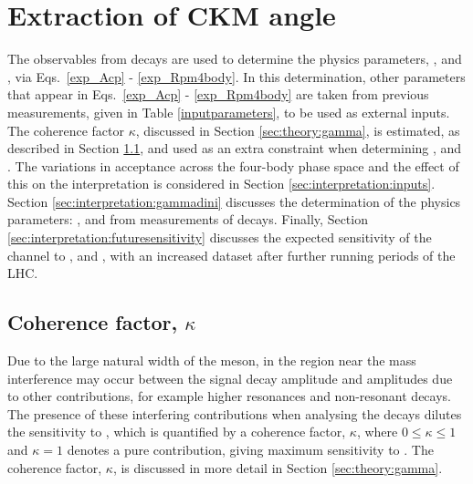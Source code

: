 \clearpage
%

\chapter{\label{ch:6-interpretation}Extraction of CKM angle \Pgamma} 

\minitoc

The \CP observables from \btodkst decays are used to determine the physics parameters, \rb, \deltab and \Pgamma, via Eqs.~\ref{exp_Acp} - \ref{exp_Rpm4body}. In this determination, other parameters that appear in Eqs.~\ref{exp_Acp} - \ref{exp_Rpm4body} are taken from previous measurements, given in Table \ref{inputparameters}, to be used as external inputs. The coherence factor $\kappa$, discussed in Section \ref{sec:theory:gamma}, is estimated, as described in Section \ref{sec:interpretation:coherence}, and used as an extra constraint when determining \rb, \deltab and \Pgamma. The variations in acceptance across the four-body phase space and the effect of this on the interpretation is considered in Section \ref{sec:interpretation:inputs}. Section \ref{sec:interpretation:gammadini} discusses the determination of the physics parameters: \rb, \deltab and \Pgamma from measurements of \btodkst decays. Finally, Section \ref{sec:interpretation:futuresensitivity} discusses the expected sensitivity of the \btodkst channel to \rb, \deltab and \Pgamma, with an increased dataset after further running periods of the LHC.

\section{Coherence factor, $\kappa$}
\label{sec:interpretation:coherence}

Due to the large natural width of the \Kstarm meson, in the region near the \Kstarm mass interference may occur between the signal \Kstarm decay amplitude and amplitudes due to other \decay{\Bm}{\D\KS\pim} contributions, for example higher \KS\pim resonances and non-resonant decays. The presence of these interfering contributions when analysing the \btodkst decays dilutes the sensitivity to \Pgamma, which is quantified by a coherence factor, $\kappa$, where $0 \leq \kappa \leq 1$ and $\kappa = 1$ denotes a pure \Kstarm contribution, giving maximum sensitivity to \Pgamma. The coherence factor, $\kappa$, is discussed in more detail in Section \ref{sec:theory:gamma}. 


